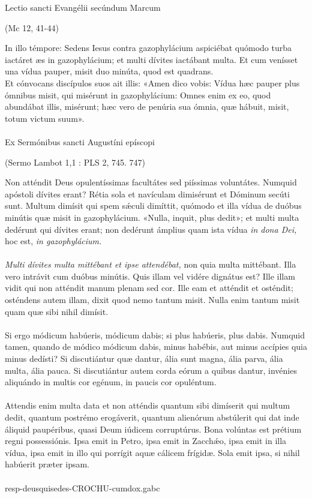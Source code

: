 \documentclass[options]{article}
\begin{document}
	Lectio sancti Evangélii secúndum Marcum
	\begin{flushright}
			(Mc 12, 41-44)
	\end{flushright}
In illo témpore:
Sedens Iesus contra gazophylácium aspiciébat quómodo turba iactáret æs in gazophylácium; et multi dívites iactábant multa. Et cum venísset una vídua pauper, misit duo minúta, quod est quadrans.\\
Et cónvocans discípulos suos ait illis: «Amen dico vobis: Vídua hæc pauper plus ómnibus misit, qui misérunt in gazophylácium: Omnes enim ex eo, quod abundábat illis, misérunt; hæc vero de penúria sua ómnia, quæ hábuit, misit, totum victum suum».\\
\\	
	Ex Sermónibus sancti Augustíni epíscopi
	\begin{flushright}
		(Sermo Lambot 1,1 : PLS 2, 745. 747)
	\end{flushright}
Non atténdit Deus opulentíssimas facultátes sed piíssimas voluntátes. Numquid apóstoli dívites erant? Rétia sola et navículam dimisérunt et Dóminum secúti sunt. Multum dimísit qui spem s\'{æ}culi dimíttit, quómodo et illa vídua de duóbus minútis quæ misit in gazophylácium. «Nulla, inquit, plus dedit»; et multi multa dedérunt qui dívites erant; non dedérunt ámplius quam ista vídua \emph{in dona Dei,} hoc est, \emph{in gazophylácium.}\\
\\
\emph{Multi dívites multa mittébant et ipse attendébat,} non quia multa mittébant. Illa vero intrávit cum duóbus minútis. Quis illam vel vidére dignátus est? Ille illam vidit qui non atténdit manum plenam sed cor. Ille eam et atténdit et osténdit; osténdens autem illam, dixit quod nemo tantum misit. Nulla enim tantum misit quam quæ sibi nihil dimísit.\\
\\
Si ergo módicum habúeris, módicum dabis; si plus habúeris, plus dabis. Numquid tamen, quando de módico módicum dabis, minus habébis, aut minus accípies quia minus dedísti? Si discutiántur quæ dantur, ália sunt magna, ália parva, ália multa, ália pauca. Si discutiántur autem corda eórum a quibus dantur, invénies aliquándo in multis cor egénum, in paucis cor opuléntum.\\
\\
Attendis enim multa data et non atténdis quantum sibi dimíserit qui multum dedit, quantum postrémo erogáverit, quantum alienórum abstúlerit qui dat inde áliquid paupéribus, quasi Deum iúdicem corruptúrus. Bona volúntas est prétium regni possessiónis. Ipsa emit in Petro, ipsa emit in Zacch\'{æ}o, ipsa emit in illa vídua, ipsa emit in illo qui porrígit aquæ cálicem frígidæ. Sola emit ipsa, si nihil habúerit præter ipsam.\\
\\
resp-deusquisedes-CROCHU-cumdox.gabc
\end{document}

